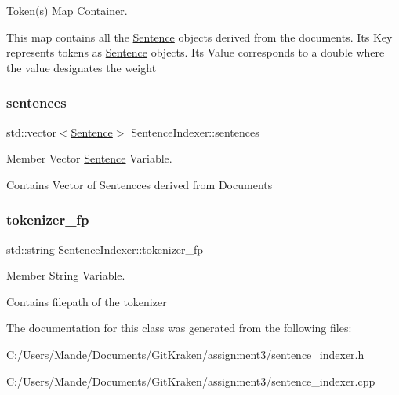 Token(s) Map Container. 

This map contains all the \hyperlink{class_sentence}{Sentence} objects derived from the documents. It\textquotesingle{}s Key represents tokens as \hyperlink{class_sentence}{Sentence} objects. It\textquotesingle{}s Value corresponds to a double where the value designates the weight \mbox{\label{class_sentence_indexer_a3c6b2408388e17f3b43ec9fec36f2628}} 
\subsubsection{\texorpdfstring{sentences}{sentences}}
{\footnotesize\ttfamily std\+::vector$<$\hyperlink{class_sentence}{Sentence}$>$ Sentence\+Indexer\+::sentences\hspace{0.3cm}{\ttfamily [private]}}



Member Vector \hyperlink{class_sentence}{Sentence} Variable. 

Contains Vector of Sentencces derived from Documents \mbox{\label{class_sentence_indexer_a6f6dd24962085f59f1a87e2c21edb58f}} 
\subsubsection{\texorpdfstring{tokenizer\+\_\+fp}{tokenizer\_fp}}
{\footnotesize\ttfamily std\+::string Sentence\+Indexer\+::tokenizer\+\_\+fp\hspace{0.3cm}{\ttfamily [private]}}



Member String Variable. 

Contains filepath of the tokenizer 

The documentation for this class was generated from the following files\+:\begin{DoxyCompactItemize}
\item 
C\+:/\+Users/\+Mande/\+Documents/\+Git\+Kraken/assignment3/sentence\+\_\+indexer.\+h\item 
C\+:/\+Users/\+Mande/\+Documents/\+Git\+Kraken/assignment3/sentence\+\_\+indexer.\+cpp\end{DoxyCompactItemize}
